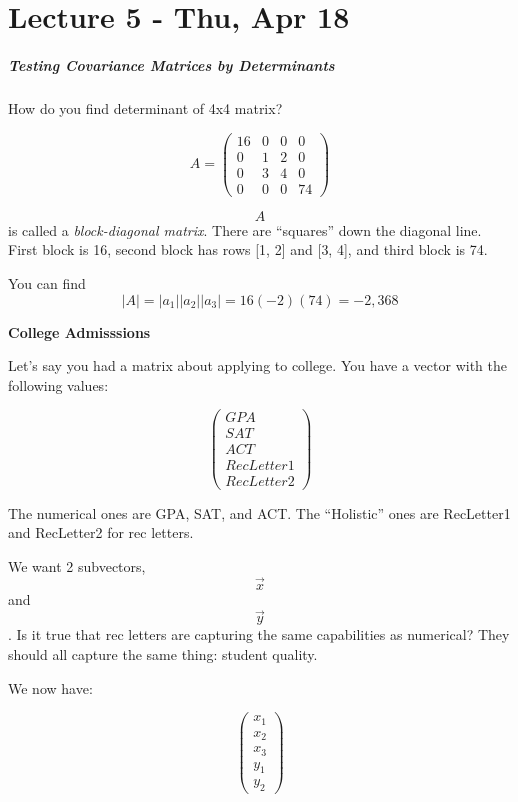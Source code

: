 \hypertarget{lecture-5---thu-apr-18}{%
\chapter{Lecture 5 - Thu, Apr 18}\label{lecture-5---thu-apr-18}}

\hypertarget{testing-covariance-matrices-by-determinants}{%
\paragraph{Testing Covariance Matrices by
Determinants}\label{testing-covariance-matrices-by-determinants}}

How do you find determinant of 4x4 matrix?

\[A = \left(\begin{array}{cccc} 16 & 0 & 0 & 0 \\ 0 & 1 & 2 & 0 \\ 0 & 3 & 4 & 0 \\ 0 & 0 & 0 & 74 \end{array}\right)\]

\[A\] is called a \emph{block-diagonal matrix}. There are ``squares''
down the diagonal line. First block is 16, second block has rows {[}1,
2{]} and {[}3, 4{]}, and third block is 74.

You can find \[| A | = | a_1 |  | a_2 |  | a_3 | = 16(-2)(74) = -2,368\]

\textbf{College Admisssions}

Let's say you had a matrix about applying to college. You have a vector
with the following values:

\[\left(\begin{array}{c} GPA \\ SAT \\ ACT \\ RecLetter1 \\ RecLetter2 \end{array} \right)\]

The numerical ones are GPA, SAT, and ACT. The ``Holistic'' ones are
RecLetter1 and RecLetter2 for rec letters.

We want 2 subvectors, \[\overrightarrow{x}\] and \[\overrightarrow{y}\].
Is it true that rec letters are capturing the same capabilities as
numerical? They should all capture the same thing: student quality.

We now have:

\[\left(\begin{array}{c} x_1 \\ x_2 \\ x_3 \\ y_1 \\ y_2 \end{array} \right)\]

